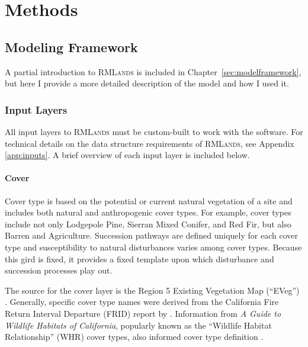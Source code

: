 
\section{Methods}
\label{sec:hrvmethods}


\subsection{Modeling Framework}
\label{sec:modelframe}

A partial introduction to \textsc{RMLands} is included in Chapter~\ref{sec:modelframework}, but here I provide a more detailed description of the model and how I used it. 

\subsubsection*{Input Layers}
\label{subsec:hrvinputlayers}

All input layers to \textsc{RMLands} must be custom-built to work with the software. For technical details on the data structure requirements of \textsc{RMLands}, see Appendix \ref{app:inputs}. A brief overview of each input layer is included below.

\paragraph*{Cover} Cover type is based on the potential or current natural vegetation of a site and includes both natural and anthropogenic cover types. For example, cover types include not only Lodgepole Pine, Sierran Mixed Conifer, and Red Fir, but also Barren and Agriculture. Succession pathways are defined uniquely for each cover type and susceptibility to natural disturbances varies among cover types. Because this gird is fixed, it provides a fixed template upon which disturbance and succession processes play out. 

The source for the cover layer is the Region 5 Existing Vegetation Map (``EVeg'') \citep{USDAForestService2009}. Generally, specific cover type names were derived from the California Fire Return Interval Departure (FRID) report by \citet{VandeWater2011}. Information from \emph{A Guide to Wildlife Habitats of California}, popularly known as the ``Wildlife Habitat Relationship'' (WHR) cover types, also informed cover type definition \citep{WHR1988}. 

